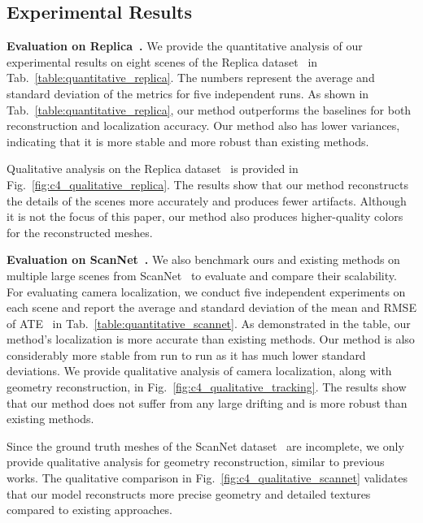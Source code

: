 \subsection{Experimental Results}
\noindent\textbf{Evaluation on Replica~\cite{replica19arxiv}.} We provide the quantitative analysis of our experimental results on eight scenes of the Replica dataset~\cite{replica19arxiv} in Tab.~\ref{table:quantitative_replica}. The numbers represent the average and standard deviation of the metrics for five independent runs. As shown in Tab.~\ref{table:quantitative_replica}, our method outperforms the baselines for both reconstruction and localization accuracy. Our method also has lower variances, indicating that it is more stable and more robust than existing methods.

Qualitative analysis on the Replica dataset~\cite{replica19arxiv} is provided in Fig.~\ref{fig:c4_qualitative_replica}. The results show that our method reconstructs the details of the scenes more accurately and produces fewer artifacts. Although it is not the focus of this paper, our method also produces higher-quality colors for the reconstructed meshes.

\vspace{1ex}
\noindent\textbf{Evaluation on ScanNet~\cite{dai2017scannet}.} We also benchmark ours and existing methods on multiple large scenes from ScanNet~\cite{dai2017scannet} to evaluate and compare their scalability. For evaluating camera localization, we conduct five independent experiments on each scene and report the average and standard deviation of the mean and RMSE of ATE~\cite{sturm2012benchmark} in Tab.~\ref{table:quantitative_scannet}. As demonstrated in the table, our method's localization is more accurate than existing methods. Our method is also considerably more stable from run to run as it has much lower standard deviations. We provide qualitative analysis of camera localization, along with geometry reconstruction, in Fig.~\ref{fig:c4_qualitative_tracking}. The results show that our method does not suffer from any large drifting and is more robust than existing methods.

Since the ground truth meshes of the ScanNet dataset~\cite{dai2017scannet} are incomplete, we only provide qualitative analysis for geometry reconstruction, similar to previous works. The qualitative comparison in Fig.~\ref{fig:c4_qualitative_scannet} validates that our model reconstructs more precise geometry and detailed textures compared to existing approaches.

